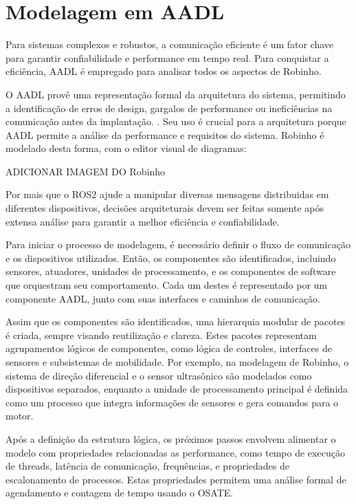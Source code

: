\chapter{Modelagem em AADL}
\label{cap:model}
Para sistemas complexos e robustos, a comunicação eficiente é um fator chave para garantir confiabilidade e performance em tempo real. Para conquistar a eficiência, AADL é empregado para analisar todos os aspectos de Robinho. 

O AADL provê uma representação formal da arquitetura do sistema, permitindo a identificação de erros de design, gargalos de performance ou ineficiências na comunicação antes da implantação. \cite{Santos2024}. Seu uso é crucial para a arquitetura porque AADL permite a análise da performance e requisitos do sistema. Robinho é modelado desta forma, com o editor visual de diagramas:

ADICIONAR IMAGEM DO Robinho

Por mais que o ROS2 ajude a manipular diversas mensagens distribuidas em diferentes dispositivos, decisões arquiteturais devem ser feitas somente após extensa análise para garantir a melhor eficiência e confiabilidade.

Para iniciar o processo de modelagem, é necessário definir o fluxo de comunicação e os dispositivos utilizados. Então, os componentes são identificados, incluindo sensores, atuadores, unidades de processamento, e os componentes de software que orquestram seu comportamento. Cada um destes é representado por um componente AADL, junto com suas interfaces e caminhos de comunicação.

Assim que os componentes são identificados, uma hierarquia modular de pacotes é criada, sempre visando reutilização e clareza. Estes pacotes representam agrupamentos lógicos de componentes, como lógica de controles, interfaces de sensores e subsistemas de mobilidade. Por exemplo, na modelagem de Robinho, o sistema de direção diferencial e o sensor ultrasônico são modelados como dispositivos separados, enquanto a unidade de processamento principal é definida como um processo que integra informações de sensores e gera comandos para o motor.

Após a definição da estrutura lógica, os próximos passos envolvem alimentar o modelo com propriedades relacionadas as performance, como tempo de execução de threads, latência de comunicação, frequências, e propriedades de escalonamento de processos. Estas propriedades permitem uma análise formal de agendamento e contagem de tempo usando o OSATE.


